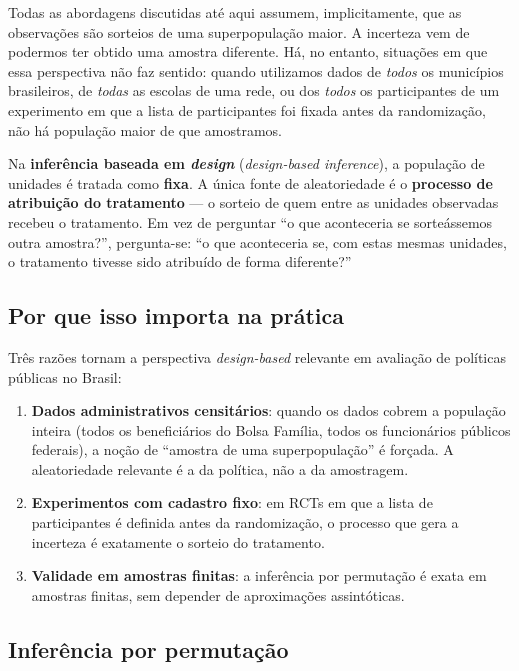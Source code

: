 Todas as abordagens discutidas até aqui assumem, implicitamente, que as observações são sorteios de uma superpopulação maior. A incerteza vem de podermos ter obtido uma amostra diferente. Há, no entanto, situações em que essa perspectiva não faz sentido: quando utilizamos dados de \textit{todos} os municípios brasileiros, de \textit{todas} as escolas de uma rede, ou dos \textit{todos} os participantes de um experimento em que a lista de participantes foi fixada antes da randomização, não há população maior de que amostramos.

Na \textbf{inferência baseada em \textit{design}} (\textit{design-based inference}), a população de unidades é tratada como \textbf{fixa}. A única fonte de aleatoriedade é o \textbf{processo de atribuição do tratamento} — o sorteio de quem entre as unidades observadas recebeu o tratamento. Em vez de perguntar ``o que aconteceria se sorteássemos outra amostra?'', pergunta-se: ``o que aconteceria se, com estas mesmas unidades, o tratamento tivesse sido atribuído de forma diferente?''

\subsection*{Por que isso importa na prática}

Três razões tornam a perspectiva \textit{design-based} relevante em avaliação de políticas públicas no Brasil:

\begin{enumerate}[leftmargin=*, label=(\roman*)]
  \item \textbf{Dados administrativos censitários}: quando os dados cobrem a população inteira (todos os beneficiários do Bolsa Família, todos os funcionários públicos federais), a noção de ``amostra de uma superpopulação'' é forçada. A aleatoriedade relevante é a da política, não a da amostragem.
  \item \textbf{Experimentos com cadastro fixo}: em RCTs em que a lista de participantes é definida antes da randomização, o processo que gera a incerteza é exatamente o sorteio do tratamento.
  \item \textbf{Validade em amostras finitas}: a inferência por permutação é exata em amostras finitas, sem depender de aproximações assintóticas.
\end{enumerate}

\subsection*{Inferência por permutação}

